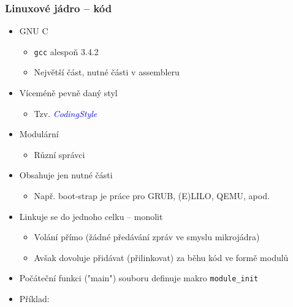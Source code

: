 \documentclass[xcolor=dvipsnames]{beamer}
\let\Oldemph\emph
\renewcommand{\emph}[1]{\textcolor{blue}{\Oldemph{#1}}}
\begin{document}
\begin{frame}
  \frametitle{Linuxové jádro -- kód}
  \begin{itemize}
  \item GNU C
  \begin{itemize}
  \item \texttt{gcc} alespoň 3.4.2
  \item Největší část, nutné části v assembleru
  \end{itemize}
  \item Víceméně pevně daný styl
  \begin{itemize}
  \item Tzv. \emph{CodingStyle}
  \end{itemize}
  \item Modulární
  \begin{itemize}
  \item Různí správci
  \end{itemize}
  \item Obsahuje jen nutné části
  \begin{itemize}
  \item Např. boot-strap je práce pro GRUB, (E)LILO, QEMU, apod.
  \end{itemize}
  \item Linkuje se do jednoho celku -- monolit
  \begin{itemize}
  \item Volání přímo (žádné předávání zpráv ve smyslu mikrojádra)
  \item Avšak dovoluje přidávat (přilinkovat) za běhu kód ve formě modulů
  \end{itemize}
  \item Počáteční funkci ("main") souboru definuje makro \texttt{module\_init}
  \item Příklad:
  \end{itemize}

\end{frame}
\end{document}
